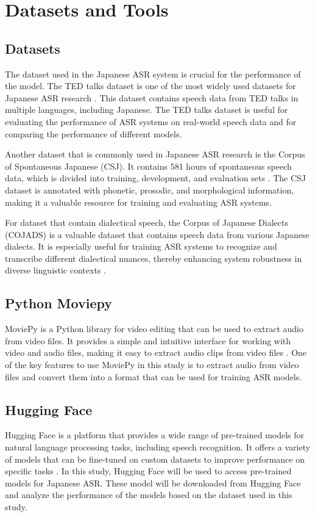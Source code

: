\section{ Datasets and Tools }
\subsection{Datasets}
The dataset used in the Japanese ASR system is crucial for the performance of the model. The TED talks dataset is one of the most widely used datasets for Japanese ASR research \parencite{Afouras}. This dataset contains speech data from TED talks in multiple languages, including Japanese. The TED talks dataset is useful for evaluating the performance of ASR systems on real-world speech data and for comparing the performance of different models.

Another dataset that is commonly used in Japanese ASR research is the Corpus of Spontaneous Japanese (CSJ). It contains 581 hours of spontaneous speech data, which is divided into training, development, and evaluation sets \parencite{ando2021}. The CSJ dataset is annotated with phonetic, prosodic, and morphological information, making it a valuable resource for training and evaluating ASR systems. 

For dataset that contain dialectical speech, the Corpus of Japanese Dialects (COJADS) is a valuable dataset that contains speech data from various Japanese dialects. It is especially useful for training ASR systems to recognize and transcribe different dialectical nuances, thereby enhancing system robustness in diverse linguistic contexts \parencite{kibe2018intonational}.

\subsection{Python Moviepy}
MoviePy is a Python library for video editing that can be used to extract audio from video files. It provides a simple and intuitive interface for working with video and audio files, making it easy to extract audio clips from video files \parencite{boishakhi2021multi}. One of the key features to use MoviePy in this study is to extract audio from video files and convert them into a format that can be used for training ASR models.

\subsection{Hugging Face}
Hugging Face is a platform that provides a wide range of pre-trained models for natural language processing tasks, including speech recognition. It offers a variety of models that can be fine-tuned on custom datasets to improve performance on specific tasks \parencite{boishakhi2021multi}. In this study, Hugging Face will be used to access pre-trained models for Japanese ASR. These model will be downloaded from Hugging Face and analyze the performance of the models based on the dataset used in this study.


